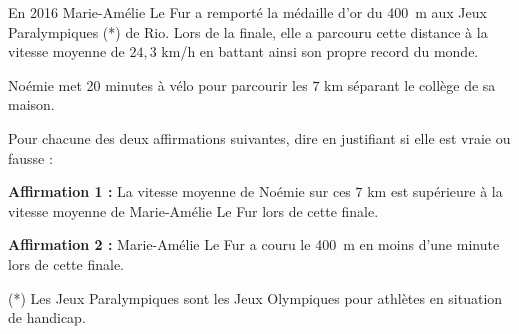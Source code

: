 
\medskip

En 2016 Marie-Amélie Le Fur a remporté la médaille d'or du 400~m aux
Jeux Paralympiques (*) de Rio. Lors de la finale, elle a parcouru cette
distance à la vitesse moyenne de $24,3$ km/h en battant ainsi son propre
record du monde.

Noémie met 20 minutes à vélo pour parcourir les $7$ km séparant le collège
de sa maison. 

Pour chacune des deux affirmations suivantes, dire en justifiant si elle est vraie ou fausse :

\medskip

\textbf{Affirmation 1 :} \og La vitesse moyenne de Noémie sur ces $7$ km est supérieure à la vitesse
moyenne de Marie-Amélie Le Fur lors de cette finale. \fg

\medskip

\textbf{Affirmation 2 :} \og Marie-Amélie Le Fur a couru le 400~m en moins d'une minute lors de cette
finale. \fg

\medskip

(*) Les Jeux Paralympiques sont les Jeux Olympiques pour athlètes en situation de handicap.
